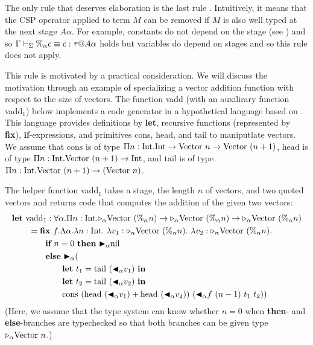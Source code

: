 The only rule that deserves elaboration is the last rule \QPercent.
Intuitively, it means that the CSP operator applied to term $M$ can be
removed if $M$ is also well typed at the next stage \(A\alpha\).
For example, constants do not depend on the stage (see \TConst) and
so \(\Gamma\vdash_\Sigma \%_\alpha c \equiv c : \tau @ A\alpha\) holds but variables
do depend on stages and so this rule does not apply.

This rule is motivated by a practical consideration.  We will discuss
the motivation through an example of specializing a vector addition
function with respect to the size of vectors.  The function
vadd (with an auxilirary function vadd$_1$) below implements a code
generator in a hypothetical language based on \LTP.  This language
provides definitions by \textbf{let}, recursive functions (represented
by \textbf{fix}), \textbf{if}-expressions, and primitives cons, head,
and tail to maniputlate vectors.
We assume that
$\text{cons}$ is of type $\Pi n:\textrm{Int}.\textrm{Int} \to \text{Vector}\ n \to \text{Vector}\ (n+1)$, 
$\text{head}$ is of type $\Pi n:\textrm{Int}.\text{Vector}\ (n+1) \to \textrm{Int}$, and
$\text{tail}$ is of type $\Pi n:\textrm{Int}.\text{Vector}\ (n+1) \to (\text{Vector}\ n)$.

The helper function vadd$_1$ takes a stage, the length $n$ of vectors, and two quoted vectors and returns code that computes the addition of the given two vectors:
%
\newcommand{\Vpn}{\text{Vector}\ (\%_\alpha n)}
\begin{align*}
	  & \textbf{let}\ \text{vadd}_1 : \F\alpha.\Pi n:\I.\TW_\alpha\Vpn\to\TW_\alpha\Vpn\to\TW_\alpha\Vpn                                \\
	  & \hspace{7mm} = \textbf{fix}\ f.\Lambda\alpha.\lambda n:\I.\ \lambda v_1:\TW_\alpha\Vpn.\ \lambda v_2:\TW_\alpha\Vpn.            \\
	  & \hspace{14mm} \textbf{if}\ n = 0 \ \textbf{then}\ \TB_\alpha \text{nil}                                                                               \\
	  & \hspace{14mm} \textbf{else}\ \TB_\alpha (                                                                                       \\
	  & \hspace{21mm} \textbf{let}\ t_1 = \text{tail}\ (\TBL_\alpha v_1)\ \textbf{in}                                                   \\
	  & \hspace{21mm} \textbf{let}\ t_2 = \text{tail}\ (\TBL_\alpha v_2)\ \textbf{in}                                                   \\
	  & \hspace{21mm} \text{cons}\ (\text{head}\ (\TBL_\alpha v_1) + \text{head}\ (\TBL_\alpha v_2))\ (\TBL_\alpha f\ (n-1)\ t_1\ t_2))
\end{align*}
(Here, we assume that the type system can know whether $n=0$ when
\textbf{then}- and \textbf{else}-branches are typechecked so that
both branches can be given type \({\mathop{\triangleright}}_\alpha \text{Vector }n\).)

